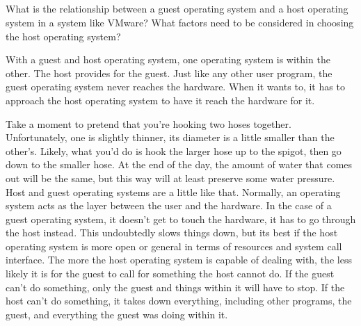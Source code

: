 \documentclass[letterpaper, 10pt,DIV=13]{scrartcl}
\numberwithin{equation}{section} %
\numberwithin{figure}{section} %
\numberwithin{table}{section} %
\begin{document}
\subsection{}
What is the relationship between a guest operating system and a host operating system in a system like VMware? What factors need to be considered in choosing the host operating system?

With a guest and host operating system, one operating system is within the other. The host provides for the guest. Just like any other user program, the guest operating system never reaches the hardware. When it wants to, it has to approach the host operating system to have it reach the hardware for it.

Take a moment to pretend that you're hooking two hoses together. Unfortunately, one is slightly thinner, its diameter is a little smaller than the other's. Likely, what you'd do is hook the larger hose up to the spigot, then go down to the smaller hose. At the end of the day, the amount of water that comes out will be the same, but this way will at least preserve some water pressure. Host and guest operating systems are a little like that. Normally, an operating system acts as the layer between the user and the hardware. In the case of a guest operating system, it doesn't get to touch the hardware, it has to go through the host instead. This undoubtedly slows things down, but its best if the host operating system is more open or general in terms of resources and system call interface. The more the host operating system is capable of dealing with, the less likely it is for the guest to call for something the host cannot do. If the guest can't do something, only the guest and things within it will have to stop. If the host can't do something, it takes down everything, including other programs, the guest, and everything the guest was doing within it.
\end{document}
